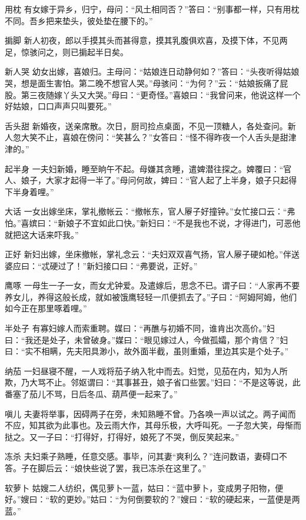 \documentclass[12pt,UTF8]{ctexbook}
\begin{document}
用枕
有女嫁于异乡，归宁，母问：“风土相同否？”答曰：“别事都一样，只有用枕不同。吾乡把来垫头，彼处垫在腰下的。”

掮脚
新人初夜，郎以手摸其头而甚得意，摸其乳腹俱欢喜，及摸下体，不见两足，惊骇问之，则已掮起半日矣。

新人哭
幼女出嫁，喜娘归。主母问：“姑娘连日动静何如？”答曰：“头夜听得姑娘哭，想是面生害怕。第二晚不想官人哭。”母骇问：“为何？”云：“姑娘扳痛了屁股。第三夜随嫁丫头又大哭。”母曰：“更奇怪。”喜娘曰：“我曾问来，他说这样一个好姑娘，口口声声只叫要死。”

舌头甜
新婚夜，送亲席散。次日，厨司捡点桌面，不见一顶糖人，各处查问。新人忽大笑不止，喜娘在傍问：“笑甚么？”女答曰：“怪不得昨夜一个人舌头是甜津津的。”

起半身
一夫妇新婚，睡至晌午不起。母嫌其贪睡，遣婢潜往探之。婢覆曰：“官人、娘子，大家才起得一半了。”母问何故，婢曰：“官人起了上半身，娘子只起得下半身着哩。”

大话
一女出嫁坐床，掌礼撤帐云：“撤帐东，官人屪子好撞钟。”女忙接口云：“弗怕。”喜嫔曰：“新娘子不宜如此口快。”新妇曰：“不是我也不说，才得进门，可恶他就把这大话来吓我。”

正好
新妇出嫁，坐床撤帐，掌礼念云：“夫妇双双喜气扬，官人屪子硬如枪。”伴送婆应曰：“忒硬过了！”新妇接口曰：“弗要说，正好。”

鹰啄
一母生一子一女，而女尤钟爱。及遣嫁后，思念不已。谓子曰：“人家再不要养女儿，养得这般长成，就如被饿鹰轻轻一爪便抓去了。”子曰：“阿姆阿姆，他们如今正在那里啄着哩。”

半处子
有寡妇嫁人而索重聘。媒曰：“再醮与初婚不同，谁肯出次高价。”妇曰：“我还是处子，未曾破身。”媒曰：“眼见嫁过人，今做孤孀，那个肯信？”妇曰：“实不相瞒，先夫阳具渺小，故外面半截，虽则重婚，里边其实是个处子。”

纳茄
一妇昼寝不醒，一人戏将茄子纳入牝中而去。妇觉，见茄在内，知为人所欺，乃大骂不止。邻妪谓曰：“其事甚丑，娘子省口些罢。”妇曰：“不是这等说，此番塞了茄儿不骂，日后冬瓜、葫芦便一起来了。”

嗔儿
夫妻将举事，因碍两子在旁，未知熟睡不曾。乃各唤一声以试之。两子闻而不应，知其欲为此事也。及云雨大作，其母乐极，大呼叫死。一子忽大笑，母惭而挞之。又一子曰：“打得好，打得好，娘死了不哭，倒反笑起来。”

冻杀
夫妇乘子熟睡，任意交感。事毕，问其妻“爽利么？”连问数语，妻碍口不答。子在脚后云：“娘快些说了罢，我已冻杀在这里了。”

软萝卜
姑嫂二人纺织，偶见萝卜一蓝，姑曰：“蓝中萝卜，变成男子阳物，便好。”嫂曰：“软的更妙。”姑曰：“为何倒要软的？”嫂曰：“软的硬起来，一蓝便是两蓝。”
\end{document}
